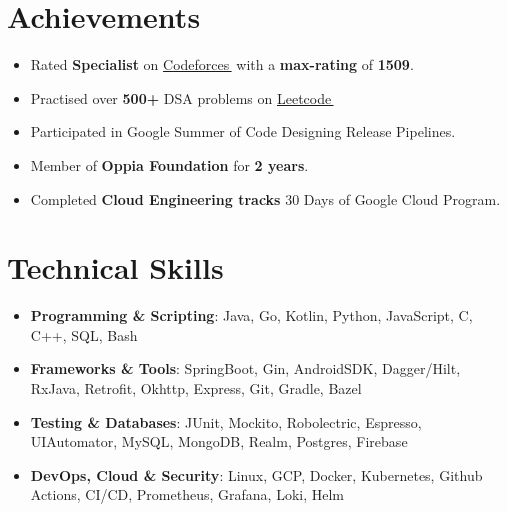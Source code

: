 \documentclass[letterpaper,1pt]{article}
\let\orighref\href
\renewcommand{\href}[2]{\orighref{#1}{#2\,\faExternalLink}}
\begin{document}
% 

\section{Achievements}
\begin{itemize}[leftmargin=*, itemsep=1pt, parsep=0pt]
  \item Rated \textbf{Specialist} on \href{https://codeforces.com/profile/segment_trACk}{Codeforces} with a \textbf{max-rating} of \textbf{1509}.
  \item Practised over \textbf{500+} DSA problems on \href{https://leetcode.com/u/dynamo_518/}{Leetcode}
  \item Participated in Google Summer of Code Designing Release Pipelines.
  \item Member of \textbf{Oppia Foundation} for \textbf{2 years}.
  \item Completed \textbf{Cloud Engineering tracks} 30 Days of Google Cloud Program.
\end{itemize}


%
\section{Technical Skills}
\begin{itemize}[leftmargin=*, itemsep=1pt, parsep=0pt]
  \selectfont\small
  \setlength\itemsep{0em}
  \setlength\parsep{0em}
  \item \textbf{Programming \& Scripting}: Java, Go, Kotlin, Python, JavaScript, C, C++, SQL, Bash
  \item \textbf{Frameworks \& Tools}: SpringBoot, Gin, AndroidSDK, Dagger/Hilt, RxJava, Retrofit, Okhttp, Express, Git, Gradle, Bazel
  \item \textbf{Testing \& Databases}: JUnit, Mockito, Robolectric, Espresso, UIAutomator, MySQL, MongoDB, Realm, Postgres, Firebase
  \item \textbf{DevOps, Cloud \& Security}: Linux, GCP, Docker, Kubernetes, Github Actions, CI/CD, Prometheus, Grafana, Loki, Helm
\end{itemize}

\end{document}
